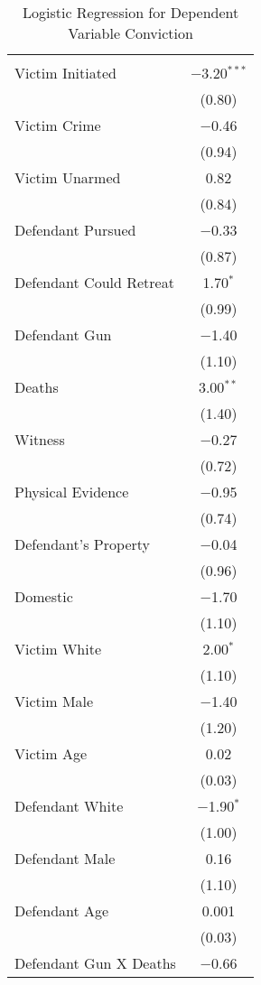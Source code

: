 \documentclass[11pt, oneside]{article}   	%
\begin{document}
\begin{table}[!htbp] \centering 
  \caption{Logistic Regression for Dependent Variable Conviction} 
  \label{} 
\footnotesize 
\begin{tabular}{@{\extracolsep{0pt}}lc} 
\\[-1.8ex]\hline \\[-1.8ex] 
\hline \\[-1.8ex] 
 Victim Initiated & $-$3.20$^{***}$ \\ 
  & (0.80) \\ 
  Victim Crime & $-$0.46 \\ 
  & (0.94) \\ 
  Victim Unarmed & 0.82 \\ 
  & (0.84) \\ 
  Defendant Pursued & $-$0.33 \\ 
  & (0.87) \\ 
  Defendant Could Retreat & 1.70$^{*}$ \\ 
  & (0.99) \\ 
  Defendant Gun & $-$1.40 \\ 
  & (1.10) \\ 
  Deaths & 3.00$^{**}$ \\ 
  & (1.40) \\ 
  Witness & $-$0.27 \\ 
  & (0.72) \\ 
  Physical Evidence & $-$0.95 \\ 
  & (0.74) \\ 
  Defendant's Property & $-$0.04 \\ 
  & (0.96) \\ 
  Domestic & $-$1.70 \\ 
  & (1.10) \\ 
  Victim White & 2.00$^{*}$ \\ 
  & (1.10) \\ 
  Victim Male & $-$1.40 \\ 
  & (1.20) \\ 
  Victim Age & 0.02 \\ 
  & (0.03) \\ 
  Defendant White & $-$1.90$^{*}$ \\ 
  & (1.00) \\ 
  Defendant Male & 0.16 \\ 
  & (1.10) \\ 
  Defendant Age & 0.001 \\ 
  & (0.03) \\ 
  Defendant Gun X Deaths & $-$0.66 \\ 

\end{tabular}
\end{table}
\end{document}
